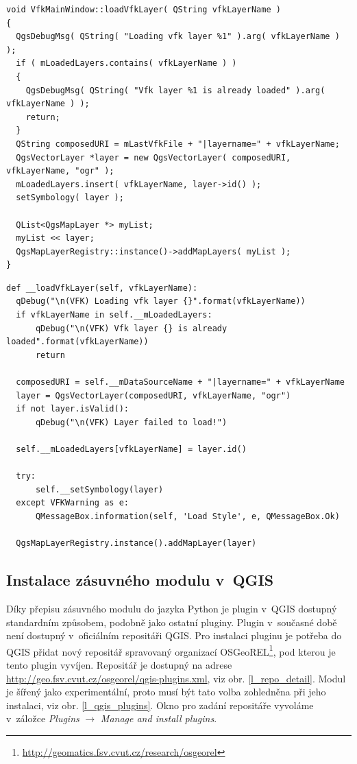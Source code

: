 \documentclass[a4paper,12pt,oneside]{book}
\begin{document}
{\scriptsize
\begin{lstlisting}[style=c++, 
		    caption=Kód pro načtení vektorové vrstvy v~C++, 
		    label=l_loadLayerC++]
 void VfkMainWindow::loadVfkLayer( QString vfkLayerName )
{
  QgsDebugMsg( QString( "Loading vfk layer %1" ).arg( vfkLayerName ) );
  if ( mLoadedLayers.contains( vfkLayerName ) )
  {
    QgsDebugMsg( QString( "Vfk layer %1 is already loaded" ).arg( vfkLayerName ) );
    return;
  }
  QString composedURI = mLastVfkFile + "|layername=" + vfkLayerName;
  QgsVectorLayer *layer = new QgsVectorLayer( composedURI, vfkLayerName, "ogr" );
  mLoadedLayers.insert( vfkLayerName, layer->id() );
  setSymbology( layer );

  QList<QgsMapLayer *> myList;
  myList << layer;
  QgsMapLayerRegistry::instance()->addMapLayers( myList );
}
\end{lstlisting}
}

{\scriptsize
\begin{lstlisting}[style=python, 
		    caption=Kód pro načtení vektorové vrstvy v~jazyce Python,
		    label=l_loadLayerPython]
def __loadVfkLayer(self, vfkLayerName):
  qDebug("\n(VFK) Loading vfk layer {}".format(vfkLayerName))
  if vfkLayerName in self.__mLoadedLayers:
      qDebug("\n(VFK) Vfk layer {} is already loaded".format(vfkLayerName))
      return

  composedURI = self.__mDataSourceName + "|layername=" + vfkLayerName
  layer = QgsVectorLayer(composedURI, vfkLayerName, "ogr")
  if not layer.isValid():
      qDebug("\n(VFK) Layer failed to load!")

  self.__mLoadedLayers[vfkLayerName] = layer.id()

  try:
      self.__setSymbology(layer)
  except VFKWarning as e:
      QMessageBox.information(self, 'Load Style', e, QMessageBox.Ok)

  QgsMapLayerRegistry.instance().addMapLayer(layer)
\end{lstlisting}
}

\subsection{Instalace zásuvného modulu v~QGIS}
Díky přepisu zásuvného modulu do jazyka Python je plugin v~QGIS
dostupný standardním způsobem, podobně jako ostatní pluginy. Plugin
v~současné době není dostupný v~oficiálním repositáři QGIS. Pro
instalaci pluginu je potřeba do QGIS přidat nový repositář spravovaný
organizací
OSGeoREL\footnote{\url{http://geomatics.fsv.cvut.cz/research/osgeorel}},
pod kterou je tento plugin vyvíjen. Repositář je dostupný na adrese
\url{http://geo.fsv.cvut.cz/osgeorel/qgis-plugins.xml}, viz
obr. \ref{l_repo_detail}. Modul je šířený jako experimentální, proto
musí být tato volba zohledněna při jeho instalaci, viz
obr. \ref{l_qgis_plugins}. Okno pro zadání repositáře vyvoláme
v~záložce \textit{Plugins} $\rightarrow$ \textit{Manage and install
  plugins}.
\end{document}
